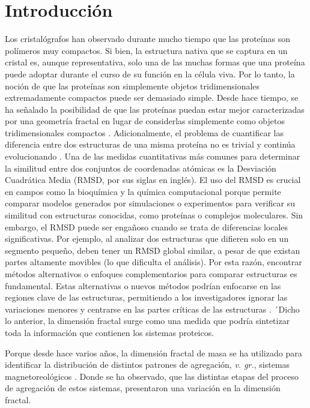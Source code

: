 \chapter{Introducción}

Los cristal\'{o}grafos han observado durante mucho tiempo que las prote\'{i}nas son pol\'{i}meros muy compactos. 
Si bien, la estructura nativa que se captura en un cristal es, aunque representativa, solo  una de las muchas formas
que una prote\'{i}na puede adoptar durante el curso de su funci\'{o}n en la c\'{e}lula viva. Por lo tanto, la noci\'{o}n de que
 las prote\'{i}nas son simplemente objetos tridimensionales extremadamente compactos puede ser demasiado simple. 
 Desde hace tiempo, se ha señalado la posibilidad de que las prote\'{i}nas puedan estar mejor caracterizadas 
 por una geometr\'{i}a fractal en lugar de considerlas simplemente como objetos tridimensionales compactos \cite{Enright2005, Dewey1997}. Adicionalmente, 
 el problema de cuantificar las diferencia entre dos estructuras de una misma prote\'{i}na no es trivial y contin\'{u}a 
 evolucionando \cite{Kufareva2012}. Una de las medidas  cuantitativas m\'{a}s comunes para 
determinar la similitud entre dos conjuntos de coordenadas at\'{o}micas 
es la Desviaci\'{o}n Cuadr\'{a}tica Media 
(RMSD, por sus siglas en ingl\'{e}s). El uso del RMSD es crucial en campos como la bioqu\'{i}mica 
y la qu\'{i}mica computacional porque permite comparar modelos generados por 
simulaciones o experimentos para verificar su similitud con estructuras 
conocidas, como prote\'{i}nas o complejos moleculares. 
Sin embargo, el RMSD puede ser engañoso cuando se trata de diferencias
 locales significativas. Por ejemplo, al analizar dos estructuras que difieren solo 
 en un segmento pequeño, deben tener un RMSD global similar, a pesar de que existan partes
 altamente movibles (lo que dificulta el an\'{a}lisis). Por esta raz\'{o}n, encontrar
  m\'{e}todos alternativos o enfoques complementarios para comparar estructuras 
  es fundamental. Estas alternativas o nuevos m\'{e}todos podr\'{i}an enfocarse en las regiones clave de las estructuras,
   permitiendo a los investigadores ignorar las variaciones menores y 
  centrarse en las partes cr\'{i}ticas de las estructuras \cite{Kufareva2012}. ´Dicho lo anterior, la dimensi\'{o}n fractal surge como una medida que podr\'{i}a sintetizar toda la informaci\'{o}n que contienen los sistemas proteicos. 

Porque desde hace varios años, la dimensi\'{o}n fractal de masa se ha utilizado para identificar la distribuci\'{o}n de distintos patrones de agregaci\'{o}n, \textit{v. gr.}, sistemas magnetoreol\'{o}gicos  \cite{Carrillo2003}. Donde se ha observado, que las distintas etapas del proceso de agregaci\'{o}n de estos sistemas, presentaron una variaci\'{o}n en la dimensi\'{o}n fractal.


